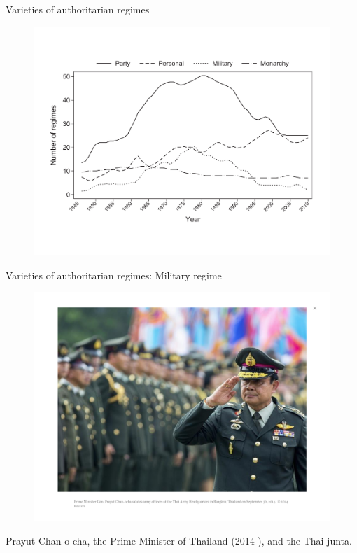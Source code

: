 \documentclass[10pt]{beamer}
\begin{document}
\begin{frame}{Varieties of authoritarian regimes}
	\begin{figure}
	\centering
	\includegraphics[scale=0.4]{Figs/GWF/type}
	\end{figure}
\end{frame}

\begin{frame}{Varieties of authoritarian regimes: Military regime}
	\begin{figure}
	\centering
	\includegraphics[scale=0.3]{Figs/Countries/thailand}
	\end{figure}
	\pause
	\centering
	Prayut Chan-o-cha, the Prime Minister of Thailand (2014-), and the Thai junta.
\end{frame}
\end{document}
